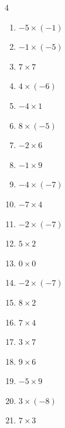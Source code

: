 \begin{multicols}{4}
\begin{enumerate}
  \item $-5\times (-1)$
        \phantom{$=5$}

  \item $-1\times (-5)$
        \phantom{$=5$}

  \item $7\times 7$
        \phantom{$=49$}

  \item $4\times (-6)$
        \phantom{$=-24$}

  \item $-4\times 1$
        \phantom{$=-4$}

  \item $8\times (-5)$
        \phantom{$=-40$}

  \item $-2\times 6$
        \phantom{$=-12$}

  \item $-1\times 9$
        \phantom{$=-9$}

\columnbreak %

  \item $-4\times (-7)$
        \phantom{$=28$}

  \item $-7\times 4$
        \phantom{$=-28$}

  \item $-2\times (-7)$
        \phantom{$=14$}

  \item $5\times 2$
        \phantom{$=10$}

  \item $0\times 0$
        \phantom{$=0$}

  \item $-2\times (-7)$
        \phantom{$=14$}

  \item $8\times 2$
        \phantom{$=16$}

  \item $7\times 4$
        \phantom{$=28$}

  \item $3\times 7$
        \phantom{$=21$}

  \item $9\times 6$
        \phantom{$=54$}

  \item $-5\times 9$
        \phantom{$=-45$}

  \item $3\times (-8)$
        \phantom{$=-24$}

  \item $7\times 3$
        \phantom{$=21$}


\end{enumerate}
\end{multicols}
